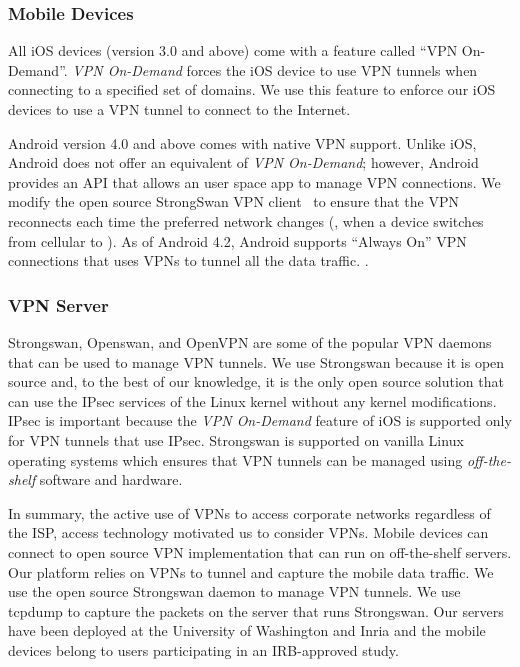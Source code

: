 \subsubsection{Mobile Devices}

All iOS devices (version 3.0 and above) come with a feature called ``VPN On-Demand''. 
\emph{VPN On-Demand} forces the iOS device to use VPN tunnels when connecting to a specified set of domains. 
We use this feature to enforce our iOS devices to use a VPN tunnel to connect to the Internet.

Android version 4.0 and above comes with native VPN support. 
Unlike iOS, Android does not offer an equivalent of \emph{VPN On-Demand}; however, Android provides an API that allows an user space app to manage VPN connections. 
We modify the open source StrongSwan VPN client~\cite{strongswanclient} to ensure that the VPN reconnects each time the preferred network changes (\eg, when a device switches from cellular to \wifi). 
As of Android 4.2, Android supports ``Always On'' VPN connections that uses VPNs to tunnel all the data traffic. 
.

\subsubsection{VPN Server}
Strongswan, Openswan, and OpenVPN are some of the popular VPN daemons that can be used to manage VPN tunnels. 
We use Strongswan because it is open source and, to the best of our knowledge, it is the only open source solution that can use the IPsec services of the Linux kernel without any kernel modifications. 
IPsec is important because the \emph{VPN On-Demand} feature of iOS is supported only for VPN tunnels that use IPsec. 
Strongswan is supported on vanilla Linux operating systems which ensures that VPN tunnels can be managed using \emph{off-the-shelf} software and hardware.

In summary, the active use of VPNs to access corporate networks regardless of the ISP, access technology motivated us to consider VPNs. 
Mobile devices can connect to open source VPN implementation that can run on off-the-shelf servers. 
Our platform relies on VPNs to tunnel and capture the mobile data traffic. 
We use the open source Strongswan daemon to manage VPN tunnels. 
We use tcpdump to capture the packets on the server that runs Strongswan. 
Our servers have been deployed at the University of Washington and Inria and the mobile devices belong to users participating in an IRB-approved study. 

